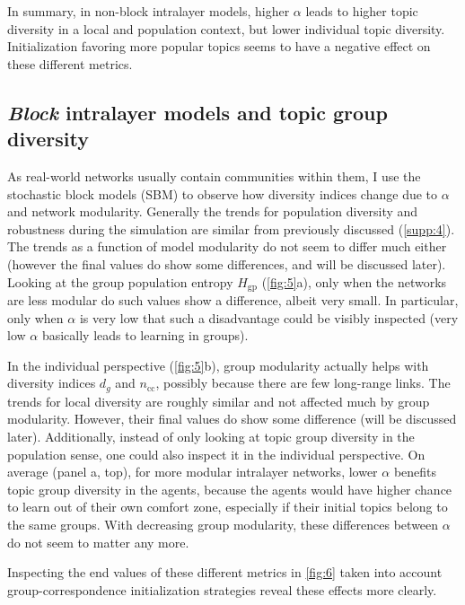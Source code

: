 

In summary, in non-block intralayer models, higher $\alpha$ leads to higher topic diversity in a local and population context, but lower individual topic diversity. Initialization favoring more popular topics seems to have a negative effect on these different metrics.


\subsection{\textit{Block} intralayer models and topic group diversity}

As real-world networks usually contain communities within them, I use the stochastic block models (SBM) to observe how diversity indices change due to $\alpha$ and network modularity. Generally the trends for population diversity and robustness during the simulation are similar from previously discussed (\autoref{supp:4}). The trends as a function of model modularity do not seem to differ much either (however the final values do show some differences, and will be discussed later). Looking at the group population entropy $H_{\mathrm{gp}}$ (\autoref{fig:5}a), only when the networks are less modular do such values show a difference, albeit very small. In particular, only when $\alpha$ is very low that such a disadvantage could be visibly inspected (very low $\alpha$ basically leads to learning in groups).

In the individual perspective (\autoref{fig:5}b), group modularity actually helps with diversity indices $d_g$ and $n_{\mathrm{cc}}$, possibly because there are few long-range links. The trends for local diversity are roughly similar and not affected much by group modularity. However, their final values do show some difference (will be discussed later). Additionally, instead of only looking at topic group diversity in the population sense, one could also inspect it in the individual perspective. On average (panel a, top), for more modular intralayer networks, lower $\alpha$ benefits topic group diversity in the agents, because the agents would have higher chance to learn out of their own comfort zone, especially if their initial topics belong to the same groups. With decreasing group modularity, these differences between $\alpha$ do not seem to matter any more.



Inspecting the end values of these different metrics in \autoref{fig:6} taken into account group-correspondence initialization strategies reveal these effects more clearly.

